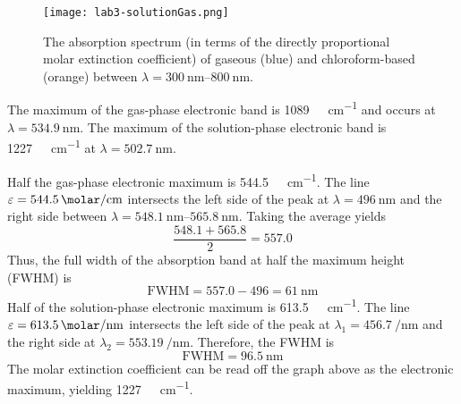 \documentclass[../labs.tex]{subfiles}
\begin{document}
\begin{figure}[H]
    \centering
    \texttt{[image: lab3-solutionGas.png]}
    \caption{The absorption spectrum (in terms of the directly proportional molar extinction coefficient) of gaseous\supercite{bib:gasI2} (blue) and chloroform-based (orange)  between $\lambda=\SIrange{300}{800}{\nano\meter}$.}
    \label{fig:solutionGas3}
\end{figure}
The maximum of the gas-phase electronic band is \SI{1089}{\per\molar\per\centi\meter} and occurs at $\lambda=\SI{534.9}{\nano\meter}$. The maximum of the solution-phase electronic band is \SI{1227}{\per\molar\per\centi\meter} at $\lambda=\SI{502.7}{\nano\meter}$.\par
Half the gas-phase electronic maximum is \SI{544.5}{\per\molar\per\centi\meter}. The line $\varepsilon=\SI{544.5}{\per\molar\per\centi\meter}$ intersects the left side of the peak at $\lambda=\SI{496}{\nano\meter}$ and the right side between $\lambda=\SIrange{548.1}{565.8}{\nano\meter}$. Taking the average yields
\begin{equation*}
    \frac{548.1+565.8}{2} = 557.0
\end{equation*}
Thus, the full width of the absorption band at half the maximum height (FWHM) is
\begin{equation*}
    \text{FWHM} = 557.0-496 = \SI{61}{\nano\meter}
\end{equation*}
Half of the solution-phase electronic maximum is \SI{613.5}{\per\molar\per\centi\meter}. The line $\varepsilon=\SI{613.5}{\per\molar\per\nano\meter}$ intersects the left side of the peak at $\lambda_1=\SI{456.7}{\per\nano\meter}$ and the right side at $\lambda_2=\SI{553.19}{\per\nano\meter}$. Therefore, the FWHM is
\begin{equation*}
    \text{FWHM} = \SI{96.5}{\nano\meter}
\end{equation*}
The molar extinction coefficient can be read off the graph above as the electronic maximum, yielding \SI{1227}{\per\molar\per\centi\meter}.
\end{document}
